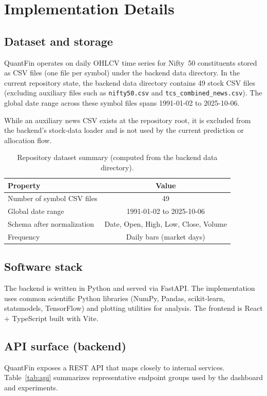 \documentclass[conference]{IEEEtran}
\begin{document}
\section{Implementation Details}\label{sec:impl}
\subsection{Dataset and storage}
QuantFin operates on daily OHLCV time series for Nifty~50 constituents stored as CSV files (one file per symbol) under the backend data directory. In the current repository state, the backend data directory contains 49 stock CSV files (excluding auxiliary files such as \texttt{nifty50.csv} and \texttt{tcs\_combined\_news.csv}). The global date range across these symbol files spans 1991-01-02 to 2025-10-06.

While an auxiliary news CSV exists at the repository root, it is excluded from the backend's stock-data loader and is not used by the current prediction or allocation flow.

\begin{table}[!t]
\centering
\caption{Repository dataset summary (computed from the backend data directory).}
\label{tab:dataset}
\small
\setlength{\tabcolsep}{4pt}
\renewcommand{\arraystretch}{1.15}
\begin{tabularx}{\columnwidth}{|X|c|}
\hline
\textbf{Property} & \textbf{Value}\\
\hline
Number of symbol CSV files & 49\\
Global date range & 1991-01-02 to 2025-10-06\\
Schema after normalization & Date, Open, High, Low, Close, Volume\\
Frequency & Daily bars (market days)\\
\hline
\end{tabularx}
\end{table}

\subsection{Software stack}
The backend is written in Python and served via FastAPI. The implementation uses common scientific Python libraries (NumPy, Pandas, scikit-learn, statsmodels, TensorFlow) and plotting utilities for analysis. The frontend is React + TypeScript built with Vite.

\subsection{API surface (backend)}
QuantFin exposes a REST API that maps closely to internal services. Table~\ref{tab:api} summarizes representative endpoint groups used by the dashboard and experiments.
\end{document}
